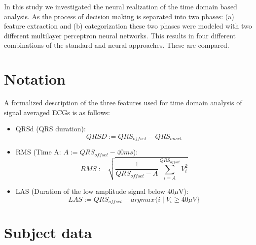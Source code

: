 \documentclass[twocolumn]{cinc}
\begin{document}
In this study we investigated the neural realization of the time domain based analysis.
As the process of decision making is separated into two phases: (a) feature extraction and (b) categorization
these two phases were modeled with two different multilayer perceptron neural networks. 
This results in four different combinations of the standard and neural approaches. These are compared.



\section{Notation}

A formalized description of the three features used for time domain analysis of signal averaged
ECGs is as follows:

\vspace*{-2cm}
\centerline{}
\vspace*{-7.5cm}        
{\small
\begin{itemize}
\item QRSd (QRS duration):
\[
 QRSD := QRS_{offset} - QRS_{onset}
\]
\item RMS (Time A: $A:= QRS_{offset} - 40ms$): 
\[
RMS := \sqrt{\frac{1}{QRS_{offset} - A} \sum_{i=A}^{QRS_{offset}} V_i^2}
\]
\item LAS (Duration of the low amplitude signal below 40$\mu$V):
\[
LAS := QRS_{offset} - argmax \{ i \; | \; V_i \ge 40 \mu V \}
\] 
\end{itemize}}
    

\section{Subject data}
\end{document}
